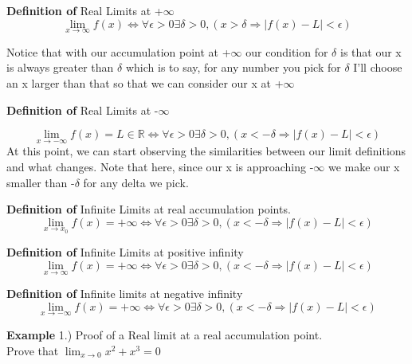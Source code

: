 \documentclass[12pt]{article}
\theoremstyle{definition}
\newenvironment{example}{\vspace{1em}\noindent\textbf{Example}}{\vspace{1em}}
\newenvironment{definition}{\vspace{1em}\noindent\textbf{Definition of}}{\vspace{1em}}
\begin{document}
\begin{definition}
  Real Limits at +$\infty$
   \[ \lim_{x\to\infty } f(x) \iff \forall \epsilon > 0 \exists \delta > 0,( x > \delta \Rightarrow \mid f(x) - L \mid < \epsilon )\]	

   Notice that with our accumulation point at +$\infty$ our condition for $\delta$ is that our x is always greater than $\delta$ which is to say, for any number you pick for $\delta$ I'll choose an x larger than that so that we can consider our x at +$\infty$




\end{definition}

\begin{definition}
 Real Limits at -$\infty$ 

 \[ \lim_{x\to -\infty } f(x) = L \in \mathbb{R} \iff \forall \epsilon > 0 \exists \delta > 0,( x < -\delta \Rightarrow \mid f(x) - L \mid < \epsilon )\]	
At this point, we can start observing the similarities between our limit definitions and what changes. Note that here, since our x is approaching -$\infty$ we make our x smaller than -$\delta$ for any delta we pick.

\end{definition}


\begin{definition}
Infinite Limits at real accumulation points.
  \[ \lim_{x\to x_0 } f(x) = +\infty \iff \forall \epsilon > 0 \exists \delta > 0,( x < -\delta \Rightarrow \mid f(x) - L \mid < \epsilon )\]	



\end{definition}

\begin{definition}
  Infinite Limits at positive infinity
  \[ \lim_{x\to \infty } f(x) = +\infty \iff \forall \epsilon > 0 \exists \delta > 0,( x < -\delta \Rightarrow \mid f(x) - L \mid < \epsilon )\]	


\end{definition}

\begin{definition}
Infinite limits at negative infinity
  \[ \lim_{x\to -\infty } f(x) = +\infty \iff \forall \epsilon > 0 \exists \delta > 0,( x < -\delta \Rightarrow \mid f(x) - L \mid < \epsilon )\]	



\end{definition}

\begin{example}
1.) Proof of a Real limit at a real accumulation point.\\
Prove that $ \lim_{x\to 0} x^2 + x^3 = 0$

\end{example}





 
\end{document}
